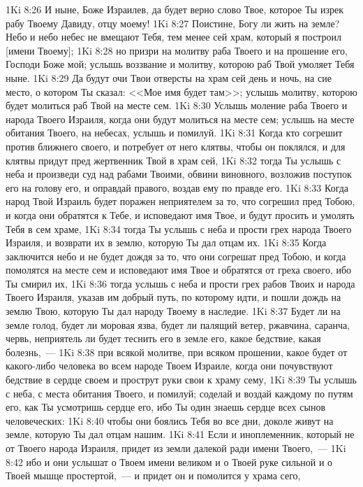\vs 1Ki 8:26 И ныне, Боже Израилев, да будет верно слово Твое, которое Ты изрек рабу Твоему Давиду, отцу моему!
\vs 1Ki 8:27 Поистине, Богу ли жить на земле? Небо и небо небес не вмещают Тебя, тем менее сей храм, который я построил [имени Твоему];
\vs 1Ki 8:28 но призри на молитву раба Твоего и на прошение его, Господи Боже мой; услышь воззвание и молитву, которою раб Твой умоляет Тебя ныне.
\vs 1Ki 8:29 Да будут очи Твои отверсты на храм сей день и ночь, на сие место, о котором Ты сказал: <<Мое имя будет там>>; услышь молитву, которою будет молиться раб Твой на месте сем.
\vs 1Ki 8:30 Услышь моление раба Твоего и народа Твоего Израиля, когда они будут молиться на месте сем; услышь на месте обитания Твоего, на небесах, услышь и помилуй.
\vs 1Ki 8:31 Когда кто согрешит против ближнего своего, и потребует от него клятвы, чтобы он поклялся, и для клятвы придут пред жертвенник Твой в храм сей,
\vs 1Ki 8:32 тогда Ты услышь с неба и произведи суд над рабами Твоими, обвини виновного, возложив поступок его на голову его, и оправдай правого, воздав ему по правде его.
\vs 1Ki 8:33 Когда народ Твой Израиль будет поражен неприятелем за то, что согрешил пред Тобою, и когда они обратятся к Тебе, и исповедают имя Твое, и будут просить и умолять Тебя в сем храме,
\vs 1Ki 8:34 тогда Ты услышь с неба и прости грех народа Твоего Израиля, и возврати их в землю, которую Ты дал отцам их.
\vs 1Ki 8:35 Когда заключится небо и не будет дождя за то, что они согрешат пред Тобою, и когда помолятся на месте сем и исповедают имя Твое и обратятся от греха своего, ибо Ты смирил их,
\vs 1Ki 8:36 тогда услышь с неба и прости грех рабов Твоих и народа Твоего Израиля, указав им добрый путь, по которому идти, и пошли дождь на землю Твою, которую Ты дал народу Твоему в наследие.
\vs 1Ki 8:37 Будет ли на земле голод, будет ли моровая язва, будет ли палящий ветер, ржавчина, саранча, червь, неприятель ли будет теснить его в земле его,  какое бедствие, какая болезнь,~---
\vs 1Ki 8:38 при всякой молитве, при всяком прошении, какое будет от какого-либо человека во всем народе Твоем Израиле, когда они почувствуют бедствие в сердце своем и прострут руки свои к храму сему,
\vs 1Ki 8:39 Ты услышь с неба, с места обитания Твоего, и помилуй; соделай и воздай каждому по путям его, как Ты усмотришь сердце его, ибо Ты один знаешь сердце всех сынов человеческих:
\vs 1Ki 8:40 чтобы они боялись Тебя во все дни, доколе живут на земле, которую Ты дал отцам нашим.
\vs 1Ki 8:41 Если и иноплеменник, который не от Твоего народа Израиля, придет из земли далекой ради имени Твоего,~---
\vs 1Ki 8:42 ибо и они услышат о Твоем имени великом и о Твоей руке сильной и о Твоей мышце простертой,~--- и придет он и помолится у храма сего,
